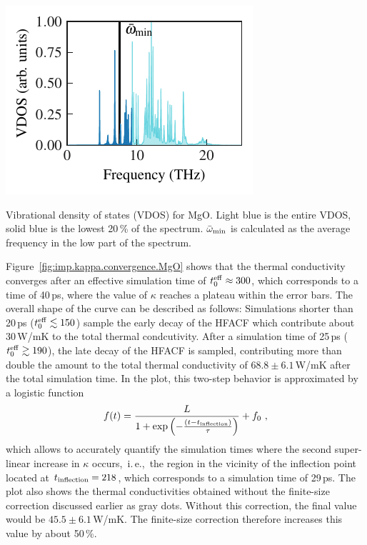 \begin{marginfigure}
	\includegraphics[width=\textwidth]{./data/plots/kappa_convergence/t_eff/vdos.pdf}
	\caption{Vibrational density of states (VDOS) for MgO. Light blue is the entire VDOS, solid blue is the lowest 20\,\% of the spectrum. $\bar{\omega}_{\rm min}$ is calculated as the average frequency in the low part of the spectrum.}
	\label{fig:imp.w_eff}
\end{marginfigure}
Figure~\ref{fig:imp.kappa.convergence.MgO} shows that the thermal conductivity converges after an effective simulation time of $t^{\rm eff}_0 \approx 300$, which corresponds to a time of 40\,ps, where the value of $\kappa$ reaches a plateau within the error bars. The overall shape of the curve can be described as follows: Simulations shorter than 20\,ps ($t^{\rm eff}_0 \lesssim 150$) sample the early decay of the HFACF which contribute about 30\,W/mK to the total thermal condcutivity. After a simulation time of 25\,ps ($t^{\rm eff}_0 \gtrsim 190$), the late decay of the HFACF is sampled, contributing more than double the amount to the total thermal conductivity of $68.8 \pm 6.1$\,W/mK after the total simulation time. In the plot, this two-step behavior is approximated by a logistic function 
\begin{align}
	f(t) 
		= \frac{L}{1 + \exp \left(-\frac{(t-t_{\rm inflection})}{\tau} \right)} + f_0~,
	\label{eq:imp.f_logistic}
\end{align}
which allows to accurately quantify the simulation times where the second super-linear increase in $\kappa$ occurs,~i.\,e.,~the region in the vicinity of the inflection point located at $t_{\rm inflection} = 218$, which corresponds to a simulation time of 29\,ps.
The plot also shows the thermal conductivities obtained without the finite-size correction discussed earlier as gray dots. Without this correction, the final value would be $45.5 \pm 6.1$\,W/mK. The finite-size correction therefore increases this value by about 50\,\%.


